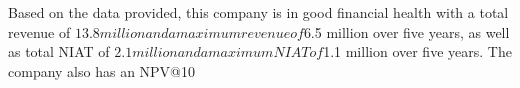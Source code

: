 

Based on the data provided, this company is in good financial health with a total revenue of $13.8 million and a maximum revenue of $6.5 million over five years, as well as total NIAT of $2.1 million and a maximum NIAT of $1.1 million over five years. The company also has an NPV@10%
